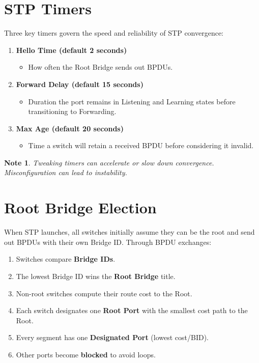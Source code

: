 \documentclass[a4paper]{report}
\newtheorem*{noteenv}{Note}
\begin{document}
\section{STP Timers}
Three key timers govern the speed and reliability of STP convergence:
\begin{enumerate}
  \item \textbf{Hello Time (default 2 seconds)}
    \begin{itemize}
      \item How often the Root Bridge sends out BPDUs.
    \end{itemize}
  \item \textbf{Forward Delay (default 15 seconds)}
    \begin{itemize}
      \item Duration the port remains in Listening and Learning states before transitioning to Forwarding.
    \end{itemize}
  \item \textbf{Max Age (default 20 seconds)}
    \begin{itemize}
      \item Time a switch will retain a received BPDU before considering it invalid.
    \end{itemize}
\end{enumerate}

\begin{noteenv}
Tweaking timers can accelerate or slow down convergence. Misconfiguration can lead to instability.
\end{noteenv}

\section{Root Bridge Election}
When STP launches, all switches initially assume they can be the root and send out BPDUs with their own Bridge ID. Through BPDU exchanges:
\begin{enumerate}
  \item Switches compare \textbf{Bridge IDs}.
  \item The lowest Bridge ID wins the \textbf{Root Bridge} title.
  \item Non-root switches compute their route cost to the Root.
  \item Each switch designates one \textbf{Root Port} with the smallest cost path to the Root.
  \item Every segment has one \textbf{Designated Port} (lowest cost/BID).
  \item Other ports become \textbf{blocked} to avoid loops.
\end{enumerate}
\end{document}
